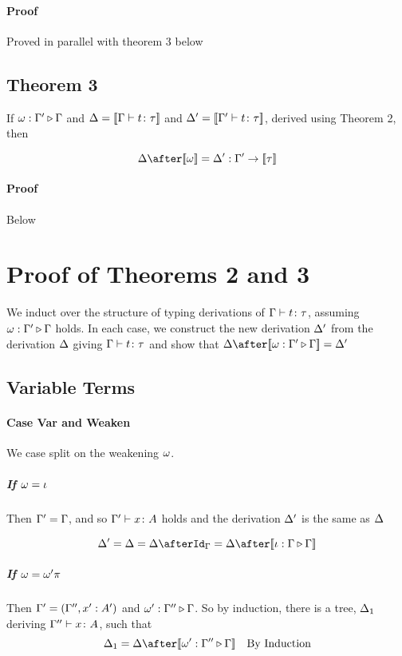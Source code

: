{    \paragraph{Proof}
    Proved in parallel with theorem 3 below
    \subsection{Theorem 3}
    
    If $\omega : \Gamma' \triangleright \Gamma$ and $\Delta = {\bf [\![}\Gamma \vdash t \colon \tau{\bf ]\!]}$ and $\Delta' = {\bf [\![}\Gamma' \vdash t \colon \tau{\bf ]\!]}$, derived using Theorem 2, then 
    
    $$
        \D \after \deno{\w} = \D' : \G' \rightarrow \deno{\tau}
    $$
    \paragraph{Proof} Below
    
    \section{Proof of Theorems 2 and 3}
    We induct over the structure of typing derivations of $\Gamma \vdash t \colon \tau$, assuming $\omega : \Gamma' \triangleright \Gamma$ holds. In each case, we construct the new derivation $\Delta'$ from the derivation $\Delta$ giving $\Gamma \vdash t \colon \tau$ and show that $\D\after\deno{\wrel{\w}{\G'}{\G}} = \D'$
    
    \subsection{Variable Terms}
    \paragraph{Case Var and Weaken}
        We case split on the weakening $\omega$.
        \subparagraph{If $\omega = \iota$}
        Then $\Gamma' = \Gamma$, and so $\Gamma' \vdash x \colon A$ holds and the derivation $\Delta'$ is the same as $\Delta$
    
        \begin{equation}
            \D' = \D = \D\after\idg = \D\after\deno{\wrel{\i}{\G}{\G}} 
        \end{equation}
        \subparagraph{If $\omega = \omega'\pi$}
        Then  $\Gamma' = (\Gamma'',x': A')$ and $\omega' : \Gamma'' \triangleright \Gamma$. So by induction, there is a tree, $\Delta_1$ deriving $\Gamma'' \vdash x \colon A$,  such that 
        \begin{equation}
            \D_1 = \D\after\deno{\wrel{\w'}{\G''}{\G}} \qt{By Induction}
        \end{equation}
        
}
